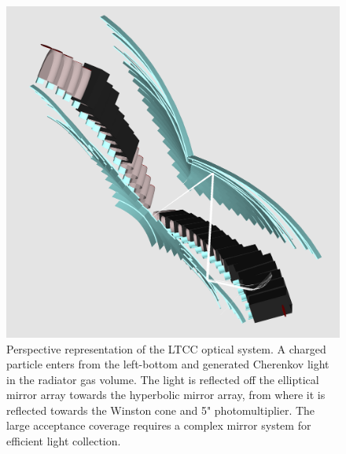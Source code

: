 \documentclass[final,3p,times,twocolumn,authoryear]{elsarticle}
\begin{document}
\begin{figure}[htbp!]
\centerline{\includegraphics[width=1.0\columnwidth]{ltcc-mod6.png}}
\caption{ Perspective representation of the LTCC optical system. A charged particle enters from the left-bottom and generated 
Cherenkov light in the radiator gas volume. The
light is reflected off the elliptical mirror array towards the hyperbolic mirror array, from where it is reflected towards the Winston cone and 
5" photomultiplier.  
The large acceptance coverage requires a complex mirror system for efficient light collection. }
\label{ltcc}
\end{figure}
\end{document}
